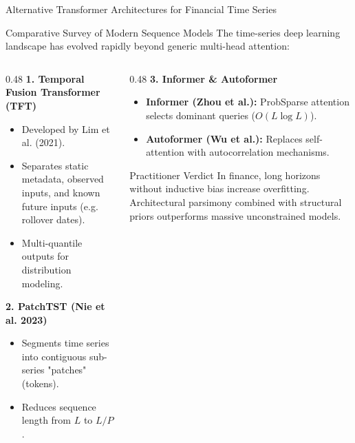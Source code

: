 \documentclass[10pt]{beamer}
\begin{document}
\begin{frame}{Alternative Transformer Architectures for Financial Time Series}
  \begin{block}{Comparative Survey of Modern Sequence Models}
    The time-series deep learning landscape has evolved rapidly beyond generic multi-head attention:
  \end{block}
  \begin{columns}[t]
    \begin{column}{0.48\textwidth}
      \textbf{1. Temporal Fusion Transformer (TFT)}
      \begin{itemize}\scriptsize
        \item Developed by Lim et al. (2021).
        \item Separates static metadata, observed inputs, and known future inputs (e.g. rollover dates).
        \item Multi-quantile outputs for distribution modeling.
      \end{itemize}
      \textbf{2. PatchTST (Nie et al. 2023)}
      \begin{itemize}\scriptsize
        \item Segments time series into contiguous sub-series "patches" (tokens).
        \item Reduces sequence length from $L$ to $L/P$.
      \end{itemize}
    \end{column}
    \begin{column}{0.48\textwidth}
      \textbf{3. Informer \& Autoformer}
      \begin{itemize}\scriptsize
        \item \textbf{Informer (Zhou et al.):} ProbSparse attention selects dominant queries ($O(L \log L)$).
        \item \textbf{Autoformer (Wu et al.):} Replaces self-attention with autocorrelation mechanisms.
      \end{itemize}
      \begin{alertblock}{Practitioner Verdict}
        In finance, long horizons without inductive bias increase overfitting. Architectural parsimony combined with structural priors outperforms massive unconstrained models.
      \end{alertblock}
    \end{column}
  \end{columns}
\end{frame}
\end{document}

